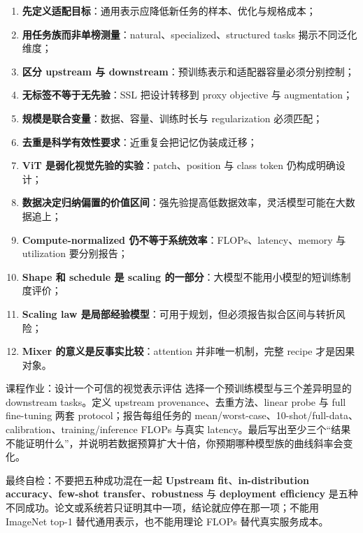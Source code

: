 \documentclass[a4paper]{article}
\begin{document}
\begin{enumerate}
  \item \textbf{先定义适配目标}：通用表示应降低新任务的样本、优化与规格成本；
  \item \textbf{用任务族而非单榜测量}：natural、specialized、structured tasks 揭示不同泛化维度；
  \item \textbf{区分 upstream 与 downstream}：预训练表示和适配器容量必须分别控制；
  \item \textbf{无标签不等于无先验}：SSL 把设计转移到 proxy objective 与 augmentation；
  \item \textbf{规模是联合变量}：数据、容量、训练时长与 regularization 必须匹配；
  \item \textbf{去重是科学有效性要求}：近重复会把记忆伪装成迁移；
  \item \textbf{ViT 是弱化视觉先验的实验}：patch、position 与 class token 仍构成明确设计；
  \item \textbf{数据决定归纳偏置的价值区间}：强先验提高低数据效率，灵活模型可能在大数据追上；
  \item \textbf{Compute-normalized 仍不等于系统效率}：FLOPs、latency、memory 与 utilization 要分别报告；
  \item \textbf{Shape 和 schedule 是 scaling 的一部分}：大模型不能用小模型的短训练制度评价；
  \item \textbf{Scaling law 是局部经验模型}：可用于规划，但必须报告拟合区间与转折风险；
  \item \textbf{Mixer 的意义是反事实比较}：attention 并非唯一机制，完整 recipe 才是因果对象。
\end{enumerate}

\begin{importantbox}{课程作业：设计一个可信的视觉表示评估}
选择一个预训练模型与三个差异明显的 downstream tasks。定义 upstream provenance、去重方法、linear probe 与 full fine-tuning 两套 protocol；报告每组任务的 mean/worst-case、10-shot/full-data、calibration、training/inference FLOPs 与真实 latency。最后写出至少三个“结果不能证明什么”，并说明若数据预算扩大十倍，你预期哪种模型族的曲线斜率会变化。
\end{importantbox}

\begin{warningbox}{最终自检：不要把五种成功混在一起}
\textbf{Upstream fit}、\textbf{in-distribution accuracy}、\textbf{few-shot transfer}、\textbf{robustness} 与 \textbf{deployment efficiency} 是五种不同成功。论文或系统若只证明其中一项，结论就应停在那一项；不能用 ImageNet top-1 替代通用表示，也不能用理论 FLOPs 替代真实服务成本。
\end{warningbox}
\end{document}

